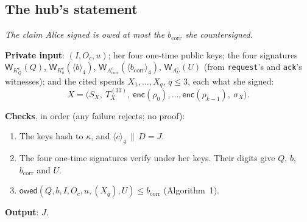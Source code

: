 \documentclass[11pt]{article}
\theoremstyle{plain}
\theoremstyle{definition}
\newcommand{\bcorr}{b_{\mathrm{corr}}}
\newcommand{\tx}[1]{\texttt{#1}}
\newcommand{\be}[2]{\langle #1\rangle_{#2}}
\newcommand{\Wots}{\mathsf{W}}
\newcommand{\owed}{\mathsf{owed}}
\newcommand{\enc}{\mathsf{enc}}
\newcommand{\Oc}{O_c}
\newcommand{\KQ}{K_{Q}^{c}}
\newcommand{\Kb}{K_{b}^{c}}
\newcommand{\Acorr}{A_{\mathrm{corr}}^{c}}
\newcommand{\AU}{A_{U}^{c}}
\begin{document}
\subsection{The hub's statement}\label{sec:statement}

\emph{The claim Alice signed is owed at most the $\bcorr$ she
countersigned.}

\textbf{Private input}: $(I, \Oc, u)$; her four one-time public keys;
the four signatures $\Wots_{\KQ}(Q)$, $\Wots_{\Kb}(\be{b}{4})$,
$\Wots_{\Acorr}(\be{\bcorr}{4})$, $\Wots_{\AU}(U)$ (from \tx{request}'s
and \tx{ack}'s witnesses); and the cited spends $X_1, \dots, X_q$, $q \le
3$, each what she signed:
\[
  X = \big(S_X,\ T_X^{(33)},\ \enc(\rho_0), \dots, \enc(\rho_{k-1}),\
  \sigma_X\big).
\]

\textbf{Checks}, in order (any failure rejects; no proof):
\begin{enumerate}[nosep]
\item The keys hash to $\kappa$, and $\be{c}{4} \,\|\, D = J$.
\item The four one-time signatures verify under her keys. Their digits
  give $Q$, $b$, $\bcorr$ and $U$.
\item $\owed(Q, b, I, \Oc, u, (X_q), U) \le \bcorr$ (Algorithm~1).
\end{enumerate}
\textbf{Output}: $J$.
\end{document}
